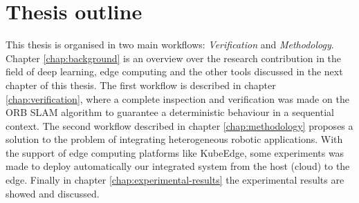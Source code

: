 \section{Thesis outline}
This thesis is organised in two main workflows: \textit{Verification} and \textit{Methodology}.
Chapter \ref{chap:background} is an overview over the research contribution in the field of  deep learning, edge computing and the other tools discussed in the next chapter of this thesis.
The first workflow is described in chapter \ref{chap:verification}, where a complete inspection and verification was made on the ORB SLAM algorithm to guarantee a deterministic behaviour in a sequential context.
The second workflow described in chapter \ref{chap:methodology} proposes a solution to the problem of integrating heterogeneous robotic applications.
With the support of edge computing platforms like KubeEdge, some experiments was made to deploy automatically our integrated system from the host (cloud) to the edge.
Finally in chapter \ref{chap:experimental-results} the experimental results are showed and discussed.



\thispagestyle{empty}